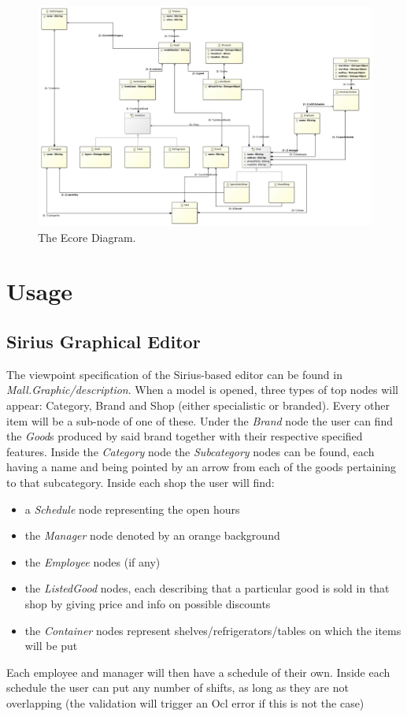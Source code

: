 \documentclass[a4paper]{article}
\begin{document}
\begin{figure}
	\includegraphics[width=\linewidth]{pictures/MallDsmclassdiagram.jpg}
	\caption{The Ecore Diagram.}
	\label{fig:mallDiag}
\end{figure}

\section{Usage}
\subsection{Sirius Graphical Editor}
The viewpoint specification of the Sirius-based editor can be found in \textit{Mall.Graphic/description}. When a model is opened, three types of top nodes will appear: Category, Brand and Shop (either specialistic or branded). Every other item will be a sub-node of one of these. Under the \textit{Brand} node the user can find the \textit{Good}s produced by said brand together with their respective specified features. Inside the \textit{Category} node the \textit{Subcategory} nodes can be found, each having a name and being pointed by an arrow from each of the goods pertaining to that subcategory. 
Inside each shop the user will find:
\begin{itemize}
	\item a \textit{Schedule} node representing the open hours
	\item the \textit{Manager} node denoted by an orange background
	\item the \textit{Employee} nodes (if any)
	\item the \textit{ListedGood} nodes, each describing that a particular good is sold in that shop by giving price and info on possible discounts
	\item the \textit{Container} nodes represent shelves/refrigerators/tables on which the items will be put
\end{itemize}
Each employee and manager will then have a schedule of their own. Inside each schedule the user can put any number of shifts, as long as they are not overlapping (the validation will trigger an Ocl error if this is not the case)
\end{document}
